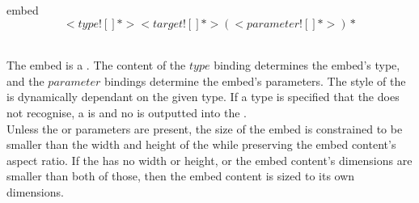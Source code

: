 \begin{identifier}{embed}
\[<type ![ ]*> <target ![ ]*>( <parameter ![ ]*>)*\]
\end{identifier}
 \\

The embed is a . The content of the \inline$type$ binding determines the embed's type, and the \inline$parameter$ bindings determine the embed's parameters. The style of the  is dynamically dependant on the given type. If a type is specified that the  does not recognise, a  is  and no  is outputted into the . \\

Unless the  or  parameters are present, the size of the embed  is constrained to be smaller than the width and height of the  while preserving the embed content's aspect ratio. If the  has no width or height, or the embed content's dimensions are smaller than both of those, then the embed content is sized to its own dimensions. \\




